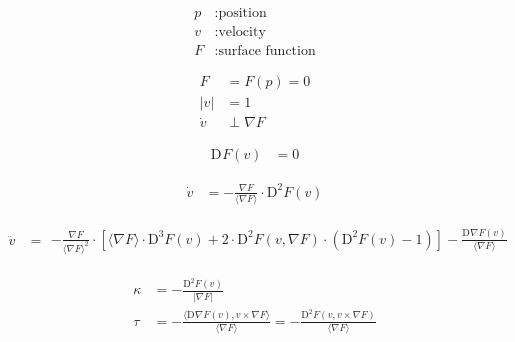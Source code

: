 \documentclass{scrartcl}
\newcommand{ \skap }[ 2 ]{ \langle #1, #2 \rangle }
\newcommand{ \skaq }[ 1 ]{ \langle #1 \rangle }
\newcommand{ \abs }[ 1 ]{ \lvert #1 \rvert }
\newcommand{ \mult }{ \cdot }
\newcommand{ \diff }[ 2 ]{ \mathrm{D}^{ #1 }#2 }
\newcommand{ \grad }[ 1 ]{ \nabla#1 }
\begin{document}
\begin{subequations}
\begin{align}
p  &:  \text{position}\\
v  &:  \text{velocity}\\
F  &:  \text{surface function}
\end{align}
\end{subequations}


\begin{subequations}
\begin{align}
F  &=  F( p )  =  0\\
\abs{ v }   &=   1\\
\dot{ v }  &\perp  \grad{ F }
\end{align}
\end{subequations}


\begin{align}
\diff{}{ F }( v )  &=  0
\end{align}


\begin{align}
\dot{ v }   &=  -\frac{ \grad{ F } }{ \skaq{ \grad{ F } } } \mult \diff{ 2 }{ F }( v )
\end{align}


\begin{align}
\ddot{ v }   &=
\begin{aligned}
- \frac{ \grad F }{    \skaq{ \grad F }^2 } \mult
  \left[    \skaq{ \grad{ F } } \mult \diff{ 3 }{ F }( v )
         +  2 \mult \diff{ 2 }{ F }( v, \grad{ F } ) \mult
            \left( \diff{ 2 }{ F }( v ) - 1 \right) \right]
-  \frac{ \diff{}{ \grad{ F } }( v ) }{ \skaq{ \grad{ F } } }
\end{aligned}
\end{align}


\begin{align}
\kappa   &=   -\frac{ \diff{ 2 }{ F }( v ) }{ \abs{ \grad{ F } } }\\
\tau     &=   -\frac{ \skap{ \diff{}{ \grad{ F } }( v ) }{ v \times \grad{ F } } }{ \skaq{ \grad{ F } } }
          =   -\frac{ \diff{ 2 }{ F }( v, v \times \grad{ F } ) }{ \skaq{ \grad{ F } } }
\end{align}
\end{document}
